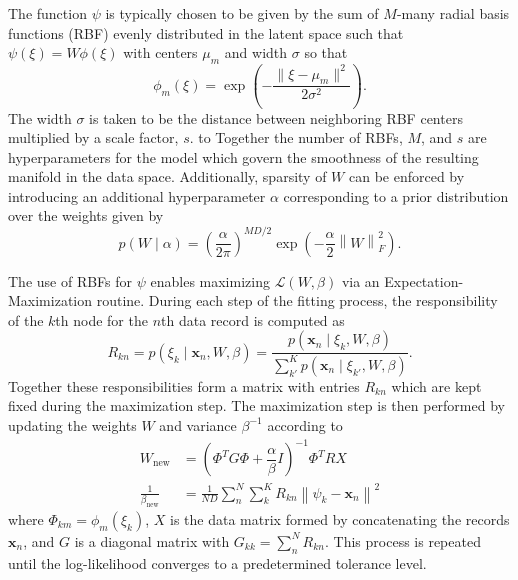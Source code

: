 \documentclass[remotesensing,article,submit,pdftex,moreauthors]{Definitions/mdpi}
\begin{document}
The function $\psi$ is typically chosen to be given by the sum of $M$-many radial basis functions (RBF) evenly distributed in the latent space such that $\psi(\xi) = W\phi(\xi)$ with centers $\mu_m$ and width $\sigma$ so that
\begin{equation}
    \phi_m(\xi) = \exp\left(-\dfrac{\lVert \xi - \mu_m \rVert^2}{2\sigma^2}\right).
\end{equation}
The width $\sigma$ is taken to be the distance between neighboring RBF centers multiplied by a scale factor, $s$. to Together the number of RBFs, $M$, and $s$ are hyperparameters for the model which govern the smoothness of the resulting manifold in the data space. Additionally, sparsity of $W$ can be enforced by introducing an additional hyperparameter $\alpha$ corresponding to a prior distribution over the weights given by
\begin{equation}\label{eq:weight-prior}
    p(W \mid \alpha) =  \left( \frac{\alpha}{2\pi} \right)^{MD/2}\exp\left(-\frac{\alpha}{2}\left\lVert W \right\rVert_{F}^2\right).
\end{equation}

The use of RBFs for $\psi$ enables maximizing $\mathcal{L}(W,\beta)$ via an Expectation-Maximization routine. During each step of the fitting process, the responsibility of the $k$th node for the $n$th data record is computed as 
\begin{equation}\label{eq:responsibility}
    R_{kn} = p(\xi_k \mid \mathbf{x}_n, W, \beta) = \dfrac{p(\mathbf{x}_n \mid \xi_k, W, \beta)}{\sum\limits_{k'}^{K} p(\mathbf{x}_n \mid \xi_{k'}, W, \beta)}.
\end{equation}
Together these responsibilities form a matrix with entries $R_{kn}$ which are kept fixed during the maximization step. The maximization step is then performed by updating the weights $W$ and variance $\beta^{-1}$ according to
\begin{align}\label{eq:m-step}
    W_{\text{new}} &= \left(\Phi^T G \Phi + \dfrac{\alpha}{\beta}I \right)^{-1} \Phi^T R X  \\
    \frac{1}{\beta_{\text{new}}} &= \frac{1}{ND} \sum\limits_{n}^{N} \sum\limits_{k}^{K} R_{kn} \left\lVert \psi_k - \mathbf{x}_n \right\rVert^2
\end{align}
where $\Phi_{km} = \phi_m(\xi_k)$, $X$ is the data matrix formed by concatenating the records $\mathbf{x}_n$, and $G$ is a diagonal matrix with $G_{kk} = \sum\limits_n^N R_{kn}$. This process is repeated until the log-likelihood converges to a predetermined tolerance level.
\end{document}
